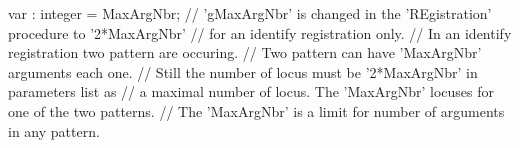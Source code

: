 \nwenddocs{}\endmoddef\nwstartdeflinemarkup{}\nwenddeflinemarkup
var : integer = MaxArgNbr;
// 'gMaxArgNbr' is changed in the 'REgistration' procedure to '2*MaxArgNbr'
// for an identify registration only.
// In an identify registration two pattern are occuring.
// Two pattern can have 'MaxArgNbr' arguments each one.
// Still the number of locus must be '2*MaxArgNbr' in parameters list as
// a maximal number of locus. The 'MaxArgNbr' locuses for one of the two patterns.
// The 'MaxArgNbr' is a limit for number of arguments in any pattern.

